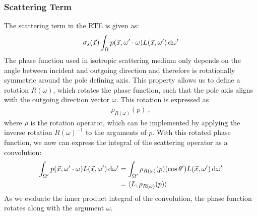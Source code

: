\subsubsection*{Scattering Term}

The scattering term in the RTE is given as:
\begin{align*}
\sigma_s(\vec{x})\int_{\Omega}p(\vec{x}, \omega'\cdot\omega)L(\vec{x}, \omega')\,\mathrm{d}\omega'
\end{align*}
The phase function used in isotropic scattering medium only depends on the angle between incident and outgoing direction and therefore is rotationally symmetric around the pole defining axis. This property allows us to define a rotation $R(\omega)$, which rotates the phase function, such that the pole axis aligns with the outgoing direction vector $\omega$. This rotation is expressed as
\begin{align*}
\rho_{R(\omega)}(p)
\ ,
\end{align*}
where $\rho$ is the rotation operator, which can be implemented by applying the inverse rotation $R(\omega)^{-1}$ to the arguments of $p$. With this rotated phase function, we now can express the integral of the scattering operator as a convolution:
\begin{align}
\int_{\Omega'}p(\vec{x}, \omega'\cdot\omega)L(\vec{x}, \omega')\,\mathrm{d}\omega'
&=
\int_{\Omega'}{\rho_{R(\omega)}(p)(\operatorname{cos}\theta')L(\vec{x}, \omega')\,\mathrm{d}\omega'}
\nonumber\\
&= \langle L,  \rho_{R(\omega)}(p)\rangle
\label{eq:complex_scatt_conv}
\end{align}
As we evaluate the inner product integral of the convolution, the phase function rotates along with the argument $\omega$.


